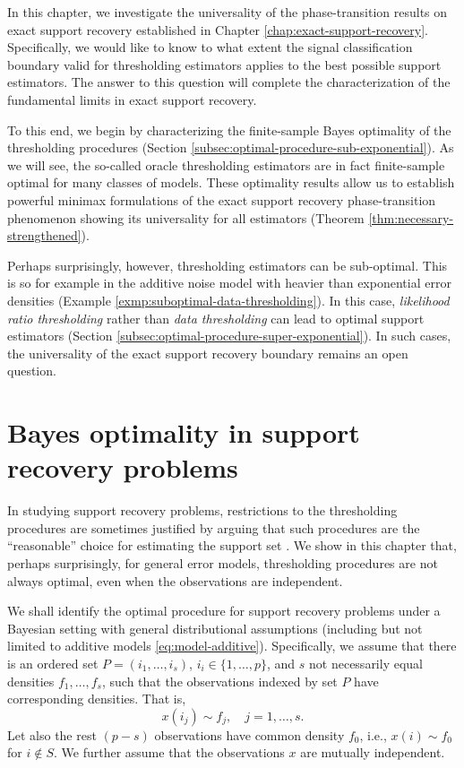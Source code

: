 
In this chapter, we investigate the universality of the phase-transition results on exact support recovery established in
Chapter \ref{chap:exact-support-recovery}.  Specifically, we would like to know to what extent the signal classification 
boundary valid for thresholding estimators applies to the best possible support estimators.  The answer to this question 
will complete the characterization of the fundamental limits in exact support recovery.

To this end, we begin by characterizing the finite-sample Bayes optimality of the thresholding procedures (Section
\ref{subsec:optimal-procedure-sub-exponential}). As we will see, the so-called oracle thresholding estimators are in 
fact finite-sample optimal for many classes of models.  These optimality results allow us to establish 
powerful minimax formulations of the exact support recovery phase-transition phenomenon showing its universality for all estimators (Theorem \ref{thm:necessary-strengthened}). 

Perhaps surprisingly, however, thresholding estimators can be sub-optimal.  This is so for example 
in the additive noise model with heavier than exponential error densities (Example 
\ref{exmp:suboptimal-data-thresholding}).   In this case, {\em likelihood ratio
thresholding} rather than {\em data thresholding} can lead to optimal support estimators
(Section \ref{subsec:optimal-procedure-super-exponential}).  In such cases, the universality 
of the exact support recovery boundary remains an open question. 




\section{Bayes optimality in support recovery problems}
\label{subsec:Bayes-optimality}

In studying support recovery problems, restrictions to the thresholding procedures 
are sometimes justified by arguing that such procedures are the ``reasonable'' choice for estimating the support set \citep[e.g.,][]{arias2017distribution}.
We show in this chapter that, perhaps surprisingly, for general error models, thresholding procedures are not always 
optimal, even when the observations are independent.

We shall identify the optimal procedure for support recovery problems under a Bayesian setting with general distributional assumptions (including but not limited to additive models \eqref{eq:model-additive}).
Specifically, we assume that there is an ordered set $P = (i_1,\ldots,i_s)$, $i_i\in\{1,\ldots,p\}$, and $s$ not necessarily equal densities $f_{1}, \ldots, f_{s}$, such that the observations indexed by set $P$ have corresponding densities. That is,
\begin{equation} \label{eq:signal-distributions-ordered}
x(i_j) \sim f_j, \quad j=1,\ldots,s.
\end{equation}
Let also the rest $(p-s)$ observations have common density $f_0$, i.e., $x(i)\sim f_0$ for $i\not\in S$.
We further assume that the observations $x$ are mutually independent.

